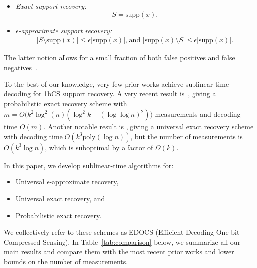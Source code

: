 \documentclass{article}
\newcommand{\supp}{\mathrm{supp}}
\begin{document}
\begin{itemize}
    \item \emph{Exact support recovery:} \[S = \supp(x).\]
    \item \emph{$\epsilon$-approximate support recovery:} 
    \begin{equation}\label{eqn:asr}
        \begin{gathered}
            |S \setminus \supp(x)| \leq \epsilon |\supp(x)| 
            \text{, and } 
            |\supp(x) \setminus S| \leq \epsilon |\supp(x)|.
        \end{gathered}
    \end{equation}
\end{itemize}
The latter notion allows for a small fraction of both false positives and false negatives~\cite{matsumoto2023improved}.

To the best of our knowledge, very few prior works achieve sublinear-time decoding for 1bCS support recovery.  A very recent result is~\cite{yang2025sublinear}, giving a probabilistic exact recovery scheme with 
$m = O\big(k^2 \log^2 (n) (\log^2 k + (\log\log n)^2)\big)$
measurements and decoding time $O(m)$. 
Another notable result is \cite{nakos2017fast}, giving a universal exact recovery scheme with decoding time $O(k^3\mathrm{poly}(\log n))$, but the number of measurements is $O(k^3\log n)$, which is suboptimal by a factor of $\Omega(k)$.

In this paper, we develop sublinear-time algorithms for:
\begin{itemize} 
    \item Universal $\epsilon$-approximate recovery,
    \item Universal exact recovery, and
    \item Probabilistic exact recovery.
\end{itemize}

We collectively refer to these schemes as \textsc{EDOCS} (Efficient Decoding One-bit Compressed Sensing). In Table~\ref{tab:comparison} below, we summarize all our main results and compare them with the most recent prior works and lower bounds on the number of measurements.  
\end{document}
